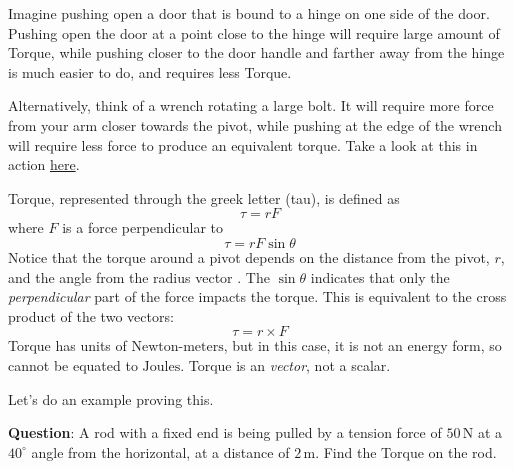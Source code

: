 Imagine pushing open a door that is bound to a hinge on one side of the door. Pushing open the door at a point close to the hinge will require large amount of Torque, while pushing closer to the door handle and farther away from the hinge is much easier to do, and requires less Torque. 

Alternatively, think of a wrench rotating a large bolt. It will require more force from your arm closer towards the pivot, while pushing at the edge of the wrench will require less force to produce an equivalent torque. Take a look at this in action \href{https://www.youtube.com/watch?v=vQ8etJxpOSw}{here}.


\begin{mdframed}[frametitle = {Torque}, style = important]
Torque, represented through the greek letter \tau (tau), is defined as
\begin{equation}
    \tau = rF
    \label{eq:torque_perp}
\end{equation}
where $F$ is a force perpendicular to 
\begin{equation}
    \tau = r F \sin\theta
    \label{eq:torque_sin}
\end{equation}
Notice that the torque around a pivot depends on the distance from the pivot, $r$, and the angle from the radius vector \theta. The $\sin\theta$ indicates that only the \emph{perpendicular} part of the force impacts the torque. This is equivalent to the cross product of the two vectors:
\begin{equation}
    \tau = r \times F
    \label{eq:torque_cross}
\end{equation}
Torque has units of $\text{Newton-meters}$, but in this case, it is not an energy form, so cannot be equated to $\text{Joules}$. Torque is an \emph{vector}, not a scalar.
\end{mdframed}

Let's do an example proving this.

\textbf{Question}: A rod with a fixed end is being pulled by a tension force of $50 \,\text{N}$ at a $40^\circ$ angle from the horizontal, at a distance of $2 \,\text{m}$. Find the Torque on the rod.



